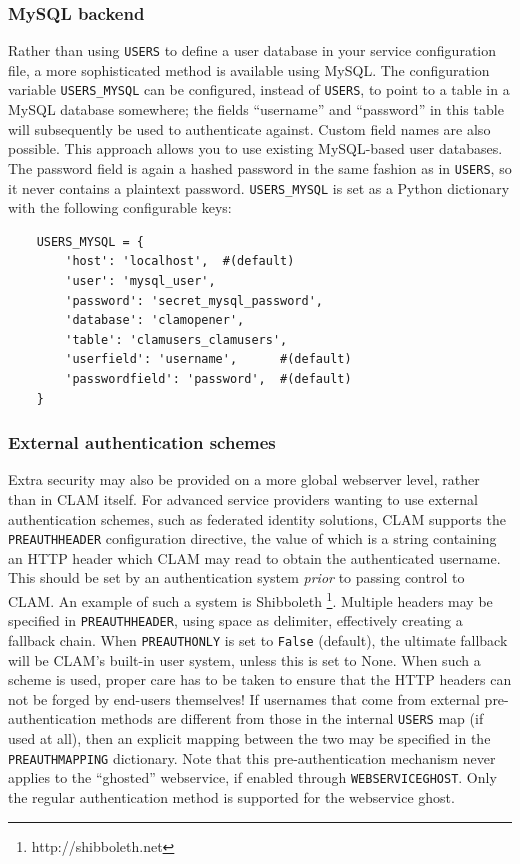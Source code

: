 \documentclass[a4paper,12pt]{report}
\begin{document}
\subsubsection{MySQL backend}

Rather than using \texttt{USERS} to define a user database in your service
configuration file, a more sophisticated method is available using MySQL. The
configuration variable \texttt{USERS\_MYSQL} can be configured, instead of
\texttt{USERS}, to point to a table in a MySQL database somewhere; the fields
``username'' and ``password'' in this table will subsequently be used to
authenticate against. Custom field names are also possible. This approach
allows you to use existing MySQL-based user databases. The password field is
again a hashed password in the same fashion as in \texttt{USERS}, so it never
contains a plaintext password. \texttt{USERS\_MYSQL} is set as a Python
dictionary with the following configurable keys:

\begin{verbatim}
    USERS_MYSQL = {
        'host': 'localhost',  #(default)
        'user': 'mysql_user',        
        'password': 'secret_mysql_password',
        'database': 'clamopener',
        'table': 'clamusers_clamusers',
        'userfield': 'username',      #(default)
        'passwordfield': 'password',  #(default)
    }
\end{verbatim}

\subsubsection{External authentication schemes}

Extra security may also be provided on a more global webserver level, rather
than in CLAM itself. For advanced service providers wanting to use external
authentication schemes, such as federated identity solutions, CLAM supports the
\texttt{PREAUTHHEADER} configuration directive, the value of which is a string
containing an HTTP header which CLAM may read to obtain the authenticated
username. This should be set by an authentication system \emph{prior} to
passing control to CLAM. An example of such a system is Shibboleth
\footnote{http://shibboleth.net}.  Multiple headers may be specified in
\texttt{PREAUTHHEADER}, using space as delimiter, effectively creating a
fallback chain. When \texttt{PREAUTHONLY} is set to \texttt{False} (default),
the ultimate fallback will be CLAM's built-in user system, unless this is set
to None. When such a scheme is used, proper care has to be taken to ensure that
the HTTP headers can not be forged by end-users themselves! If usernames that
come from external pre-authentication methods are different from those in the
internal \texttt{USERS} map (if used at all), then an explicit mapping between
the two may be specified in the \texttt{PREAUTHMAPPING} dictionary. Note that
this pre-authentication mechanism never applies to the ``ghosted'' webservice,
if enabled through \texttt{WEBSERVICEGHOST}. Only the regular authentication
method is supported for the webservice ghost.
\end{document}
